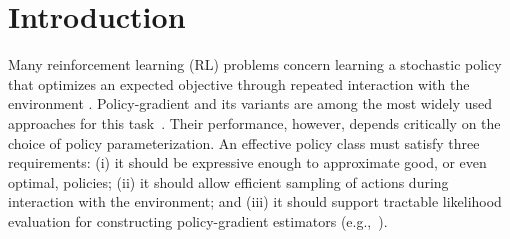 \documentclass{article}
\newcommand{\1}{\mathbbm{1}}
\numberwithin{equation}{section}
\begin{document}
\begin{abstract}


\end{abstract}



\section{Introduction}
\label{sec:introduction}

Many reinforcement learning (RL) problems concern learning a stochastic policy that optimizes an expected objective through repeated interaction with the environment \cite{sutton1998reinforcement}. Policy-gradient   and its variants   are among the most widely used approaches for this task~\cite{haarnoja2018soft, kakade2001natural, 
schulman2015trust, schulman2017proximal,sutton1999policy}. Their performance, however,  depends critically on the choice of policy parameterization. An effective policy class
must satisfy three requirements:
(i) it should be expressive enough to approximate good, or even optimal,  policies;
(ii) it should allow efficient sampling of actions
during interaction with the environment; and
(iii)  it should support tractable
likelihood evaluation for constructing policy-gradient estimators
(e.g.,~\cite{sutton1999policy}).
\end{document}
